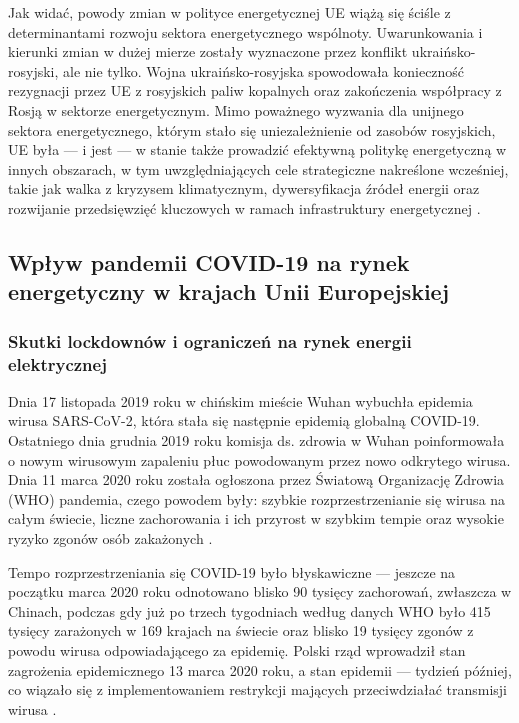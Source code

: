 \documentclass[polish, twoside, 12pt, a4paper]{article}
\theoremstyle{definition}
\theoremstyle{plain}
\theoremstyle{remark}
\begin{document}
Jak widać, powody zmian w polityce energetycznej UE wiążą się ściśle z determinantami rozwoju sektora energetycznego wspólnoty. Uwarunkowania i kierunki zmian w dużej mierze zostały wyznaczone przez konflikt ukraińsko-rosyjski, ale nie tylko. Wojna ukraińsko-rosyjska spowodowała konieczność rezygnacji przez UE z rosyjskich paliw kopalnych oraz zakończenia współpracy z Rosją w sektorze energetycznym. Mimo poważnego wyzwania dla unijnego sektora energetycznego, którym stało się uniezależnienie od zasobów rosyjskich, UE była --- i jest --- w stanie także prowadzić efektywną politykę energetyczną w innych obszarach, w tym uwzględniających cele strategiczne nakreślone wcześniej, takie jak walka z kryzysem klimatycznym, dywersyfikacja źródeł energii oraz rozwijanie przedsięwzięć kluczowych w ramach infrastruktury energetycznej \citep{ep2023}. 



\subsection{Wpływ pandemii COVID-19 na rynek energetyczny w krajach Unii Europejskiej}
\subsubsection{Skutki lockdownów i ograniczeń na rynek energii elektrycznej}

Dnia 17 listopada 2019 roku w chińskim mieście Wuhan wybuchła epidemia wirusa SARS-CoV-2, która stała się następnie epidemią globalną COVID-19. Ostatniego dnia grudnia 2019 roku komisja ds. zdrowia w Wuhan poinformowała o nowym wirusowym zapaleniu płuc powodowanym przez nowo odkrytego wirusa. Dnia 11  marca  2020  roku  została  ogłoszona przez Światową Organizację Zdrowia (WHO) pandemia, czego powodem były: szybkie rozprzestrzenianie się wirusa na całym świecie, liczne zachorowania i ich przyrost w szybkim tempie oraz wysokie ryzyko zgonów osób zakażonych \citep{gorska2023}.

Tempo rozprzestrzeniania się COVID-19 było błyskawiczne --- jeszcze na początku marca 2020 roku odnotowano blisko 90 tysięcy zachorowań, zwłaszcza w Chinach, podczas gdy już po trzech tygodniach według danych WHO było 415 tysięcy zarażonych w 169 krajach na świecie oraz blisko 19 tysięcy zgonów z powodu wirusa odpowiadającego za epidemię. Polski rząd wprowadził stan zagrożenia epidemicznego 13 marca 2020 roku, a stan epidemii --- tydzień później, co wiązało się z implementowaniem restrykcji mających przeciwdziałać transmisji wirusa \citep{wajer2023}. 
\end{document}
